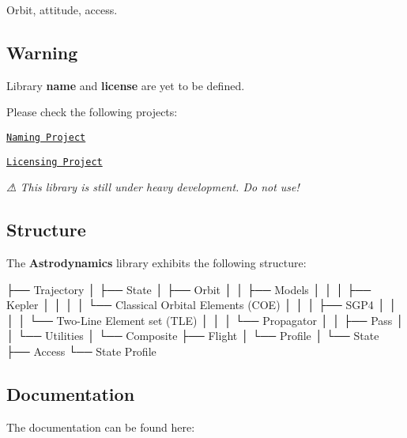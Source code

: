 Orbit, attitude, access.

\href{https://travis-ci.com/open-space-collective/library-astrodynamics}{\tt } \href{https://codecov.io/gh/open-space-collective/library-astrodynamics}{\tt } \href{https://open-space-collective.github.io/library-astrodynamics}{\tt } \href{https://badge.fury.io/gh/open-space-collective%2Flibrary-astrodynamics}{\tt } \href{https://badge.fury.io/py/LibraryAstrodynamicsPy}{\tt }

\subsection*{Warning}

Library {\bfseries name} and {\bfseries license} are yet to be defined.

Please check the following projects\+:


\begin{DoxyItemize}
\item \href{https://github.com/orgs/open-space-collective/projects/1}{\tt Naming Project}
\item \href{https://github.com/orgs/open-space-collective/projects/2}{\tt Licensing Project}
\end{DoxyItemize}

{\itshape ⚠ This library is still under heavy development. Do not use!}

\subsection*{Structure}

The {\bfseries Astrodynamics} library exhibits the following structure\+:


\begin{DoxyCode}
├── Trajectory
│   ├── State
│   ├── Orbit
│   │   ├── Models
│   │   │   ├── Kepler
│   │   │   │   └── Classical Orbital Elements (COE)
│   │   │   ├── SGP4
│   │   │   │   └── Two-Line Element \textcolor{keyword}{set} (TLE)
│   │   │   └── Propagator
│   │   ├── Pass
│   │   └── Utilities
│   └── Composite
├── Flight
│   └── Profile
│       └── State
├── Access
└── State Profile
\end{DoxyCode}


\subsection*{Documentation}

The documentation can be found here\+:


